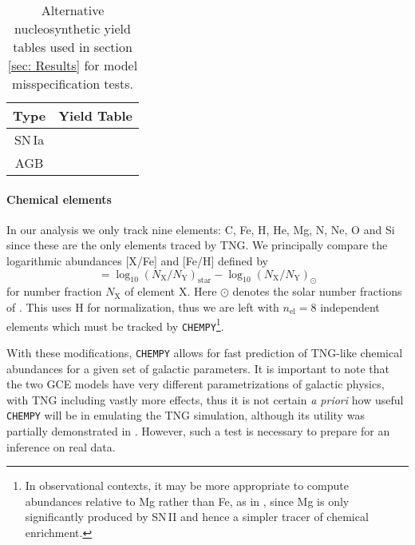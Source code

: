 \documentclass{aa}
\begin{document}
\begin{table}[]
\caption{Alternative nucleosynthetic yield tables used in section \ref{sec: Results} for model misspecification tests.}
     \centering
     \begin{tabular}{c|c}
       Type & Yield Table \\
        \hline
         SN\,Ia & \citet{2003NuPhA.718..139T}\\
         AGB & \citet{2016ApJ...825...26K}
     \end{tabular}
\label{tab:chempy_ALT_yields}
\end{table}


\paragraph{Chemical elements}
In our analysis we only track nine elements: C, Fe, H, He, Mg, N, Ne, O and Si since these are the only elements traced by TNG. We principally compare the logarithmic abundances [X/Fe] and [Fe/H] defined by 
\begin{equation}
     [\mathrm{X}/\mathrm{Y}] = \log_{10}(N_\mathrm X/N_\mathrm Y)_\mathrm{star} - \log_{10}(N_\mathrm X/N_\mathrm Y)_\odot
\end{equation}
for number fraction $N_\mathrm X$ of element X. Here $\odot$ denotes the solar number fractions of \citet{2009ARA&A..47..481A}. This uses H for normalization, thus we are left with $n_\mathrm{el}=8$ independent elements which must be tracked by \texttt{CHEMPY}\footnote{In observational contexts, it may be more appropriate to compute abundances relative to Mg rather than Fe, as in \citep{2019ApJ...874..102W}, since Mg is only significantly produced by SN\,II and hence a simpler tracer of chemical enrichment.}. 

With these modifications, \texttt{CHEMPY} allows for fast prediction of TNG-like chemical abundances for a given set of galactic parameters. It is important to note that the two GCE models have very different parametrizations of galactic physics, with TNG including vastly more effects, thus it is not certain \textit{a priori} how useful \texttt{CHEMPY} will be in emulating the TNG simulation, although its utility was partially demonstrated in \citet{2018ApJ...861...40P}. However,  such a test is necessary to prepare for an inference on real data.
\end{document}
